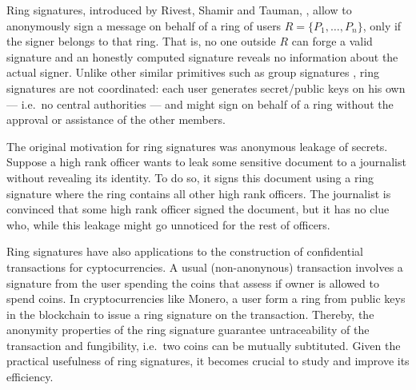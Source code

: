 
Ring signatures, introduced by Rivest, Shamir and Tauman, \cite{AC:RivShaTau01}, allow to anonymously sign a message on behalf of a ring of users $R=\{P_1,\ldots,P_n\}$, only if the signer belongs to that ring. That is, no one outside $R$ can forge a valid signature and  an honestly computed signature reveals no information about the actual signer.  
Unlike other similar primitives such as group signatures \cite{EC:ChaVan91}, ring signatures are not coordinated: each user generates secret/public keys on his own --- i.e.~no central authorities --- and might sign on behalf of a ring without the approval or assistance of the other members.

The original motivation for ring signatures was anonymous leakage of secrets. Suppose a high rank officer wants to leak some sensitive document to a journalist without revealing its identity. To do so, it signs this document using a ring signature where the ring contains all other high rank officers. The journalist is convinced that some high rank officer signed the document, but it has no clue who, while this leakage might go unnoticed for the rest of officers.

Ring signatures have also applications to the construction of confidential transactions for cyptocurrencies. A usual (non-anonynous) transaction involves a signature from the user spending the coins that assess if owner is allowed to spend coins. In cryptocurrencies like Monero, a user form a ring from public keys in the blockchain to issue a ring signature on the transaction. Thereby, the anonymity properties of the ring signature guarantee untraceability of the transaction and fungibility, i.e.~two coins can be mutually subtituted.
Given the practical usefulness of ring signatures, it becomes crucial to study and improve its efficiency.

